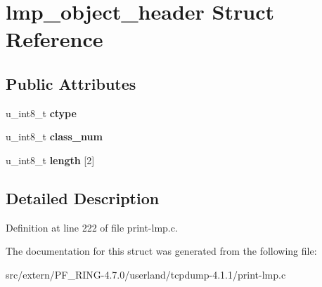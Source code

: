 \hypertarget{structlmp__object__header}{
\section{lmp\_\-object\_\-header Struct Reference}
\label{structlmp__object__header}
}
\subsection*{Public Attributes}
\begin{DoxyCompactItemize}
\item 
\hypertarget{structlmp__object__header_a3c4b3381bf4490cf55053038b71a5b80}{
u\_\-int8\_\-t {\bfseries ctype}}
\label{structlmp__object__header_a3c4b3381bf4490cf55053038b71a5b80}

\item 
\hypertarget{structlmp__object__header_a7d475cca8c7de6115db27505c7dbcb2f}{
u\_\-int8\_\-t {\bfseries class\_\-num}}
\label{structlmp__object__header_a7d475cca8c7de6115db27505c7dbcb2f}

\item 
\hypertarget{structlmp__object__header_a2daeea5ae439a5a3e95a6863e655d579}{
u\_\-int8\_\-t {\bfseries length} \mbox{[}2\mbox{]}}
\label{structlmp__object__header_a2daeea5ae439a5a3e95a6863e655d579}

\end{DoxyCompactItemize}


\subsection{Detailed Description}


Definition at line 222 of file print-\/lmp.c.



The documentation for this struct was generated from the following file:\begin{DoxyCompactItemize}
\item 
src/extern/PF\_\-RING-\/4.7.0/userland/tcpdump-\/4.1.1/print-\/lmp.c\end{DoxyCompactItemize}

